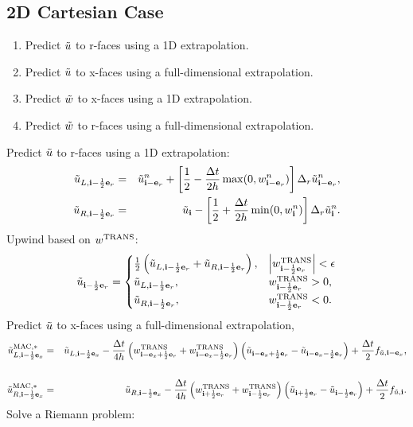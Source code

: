 \subsection{2D Cartesian Case}
\begin{enumerate}
\item Predict $\tilde{u}$ to r-faces using a 1D extrapolation.
\item Predict $\tilde{u}$ to x-faces using a full-dimensional extrapolation.
\item Predict $\tilde{w}$ to x-faces using a 1D extrapolation.
\item Predict $\tilde{w}$ to r-faces using a full-dimensional extrapolation.
\end{enumerate}
Predict $\tilde{u}$ to r-faces using a 1D extrapolation:
\begin{eqnarray}
\tilde{u}_{L,{\bf i}-\frac{1}{2}{\bf e}_r} &=& \tilde{u}_{{\bf i}-{\bf e}_r}^n + \left[\frac{1}{2} - \frac{\Delta t}{2h}\max(0,w_{{\bf i}-{\bf e}_r}^n)\right]\Delta_r \tilde{u}_{{\bf i}-{\bf e}_r}^n, \\
\tilde{u}_{R,{\bf i}-\frac{1}{2}{\bf e}_r} &=& \tilde{u}_{{\bf i}} - \left[\frac{1}{2} + \frac{\Delta t}{2h}\min(0,w_{{\bf i}}^n)\right]\Delta_r \tilde{u}_{{\bf i}}^n.
\end{eqnarray}
Upwind based on $w^{\rm TRANS}$:
\begin{equation}
\tilde{u}_{{\bf i}-\frac{1}{2}{\bf e}_r} =
\begin{cases}
\frac{1}{2}\left(\tilde{u}_{L,{\bf i}-\frac{1}{2}{\bf e}_r} + \tilde{u}_{R,{\bf i}-\frac{1}{2}{\bf e}_r}\right), & \left|w^{\rm TRANS}_{{\bf i}-\frac{1}{2}{\bf e}_r}\right| < \epsilon \\
\tilde{u}_{L,{\bf i}-\frac{1}{2}{\bf e}_r}, & w^{\rm TRANS}_{{\bf i}-\frac{1}{2}{\bf e}_r} > 0, \\
\tilde{u}_{R,{\bf i}-\frac{1}{2}{\bf e}_r}, & w^{\rm TRANS}_{{\bf i}-\frac{1}{2}{\bf e}_r} < 0. \\
\end{cases}
\end{equation}
Predict $\tilde{u}$ to x-faces using a full-dimensional extrapolation, 
\begin{eqnarray}
\tilde{u}_{L,{\bf i}-\frac{1}{2}{\bf e}_x}^{\rm MAC,*} &=& \tilde{u}_{L,{\bf i}-\frac{1}{2}{\bf e}_x} - \frac{\Delta t}{4h}\left(w_{{\bf i}-{\bf e}_x+\frac{1}{2}{\bf e}_r}^{\rm TRANS}+w_{{\bf i}-{\bf e}_x-\frac{1}{2}{\bf e}_r}^{\rm TRANS}\right)\left(\tilde{u}_{{\bf i}-{\bf e}_x+\frac{1}{2}{\bf e}_r} - \tilde{u}_{{\bf i}-{\bf e}_x-\frac{1}{2}{\bf e}_r}\right) + \frac{\Delta t}{2}f_{\tilde{u},{\bf i}-{\bf e}_x}, \nonumber \\
&& \\
\tilde{u}_{R,{\bf i}-\frac{1}{2}{\bf e}_x}^{\rm MAC,*} &=& \tilde{u}_{R,{\bf i}-\frac{1}{2}{\bf e}_x} - \frac{\Delta t}{4h}\left(w_{{\bf i}+\frac{1}{2}{\bf e}_r}^{\rm TRANS}+w_{{\bf i}-\frac{1}{2}{\bf e}_r}^{\rm TRANS}\right)\left(\tilde{u}_{{\bf i}+\frac{1}{2}{\bf e}_r} - \tilde{u}_{{\bf i}-\frac{1}{2}{\bf e}_r}\right) + \frac{\Delta t}{2}f_{\tilde{u},{\bf i}}.
\end{eqnarray}
Solve a Riemann problem:
